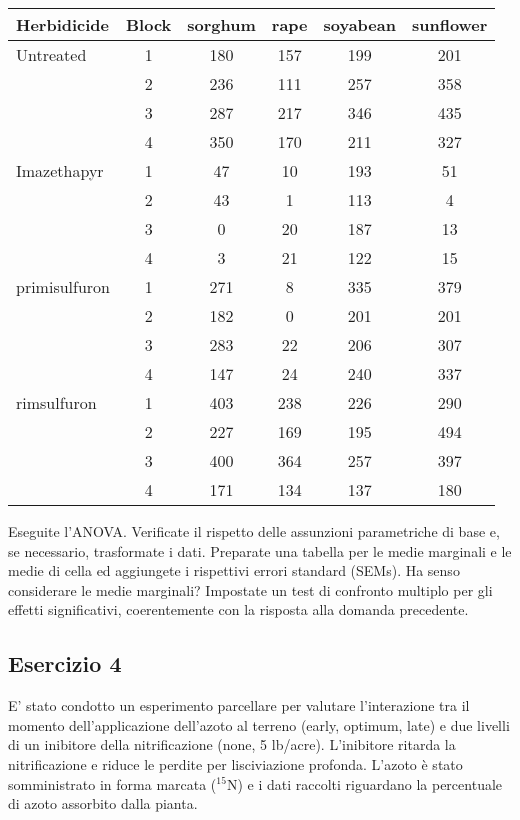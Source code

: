 \documentclass[a4paper,12pt,oneside]{book}
\begin{document}
\begin{longtable}[]{@{}lccccc@{}}
\toprule
Herbidicide & Block & sorghum & rape & soyabean & sunflower \\
\midrule
\endhead
Untreated & 1 & 180 & 157 & 199 & 201 \\
& 2 & 236 & 111 & 257 & 358 \\
& 3 & 287 & 217 & 346 & 435 \\
& 4 & 350 & 170 & 211 & 327 \\
Imazethapyr & 1 & 47 & 10 & 193 & 51 \\
& 2 & 43 & 1 & 113 & 4 \\
& 3 & 0 & 20 & 187 & 13 \\
& 4 & 3 & 21 & 122 & 15 \\
primisulfuron & 1 & 271 & 8 & 335 & 379 \\
& 2 & 182 & 0 & 201 & 201 \\
& 3 & 283 & 22 & 206 & 307 \\
& 4 & 147 & 24 & 240 & 337 \\
rimsulfuron & 1 & 403 & 238 & 226 & 290 \\
& 2 & 227 & 169 & 195 & 494 \\
& 3 & 400 & 364 & 257 & 397 \\
& 4 & 171 & 134 & 137 & 180 \\
\bottomrule
\end{longtable}

Eseguite l'ANOVA. Verificate il rispetto delle assunzioni parametriche di base e, se necessario, trasformate i dati. Preparate una tabella per le medie marginali e le medie di cella ed aggiungete i rispettivi errori standard (SEMs). Ha senso considerare le medie marginali? Impostate un test di confronto multiplo per gli effetti significativi, coerentemente con la risposta alla domanda precedente.

\hypertarget{esercizio-4-4}{%
\subsection{Esercizio 4}\label{esercizio-4-4}}

E' stato condotto un esperimento parcellare per valutare l'interazione tra il momento dell'applicazione dell'azoto al terreno (early, optimum, late) e due livelli di un inibitore della nitrificazione (none, 5 lb/acre). L'inibitore ritarda la nitrificazione e riduce le perdite per lisciviazione profonda. L'azoto è stato somministrato in forma marcata (\(^{15}\)N) e i dati raccolti riguardano la percentuale di azoto assorbito dalla pianta.
\end{document}
